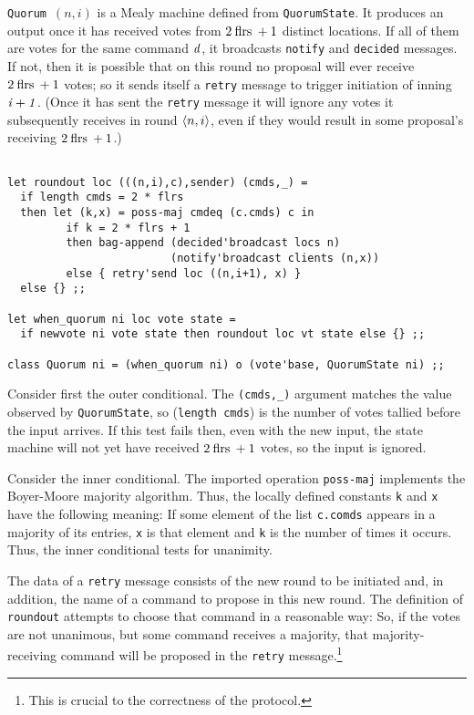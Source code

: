 \documentclass[final]{article}
\newcommand{\listinline}[1]{\text{\lstinline{#1}}}
\begin{document}
\lstinline{Quorum}~$(n,i)$ is a Mealy machine defined from
\lstinline{QuorumState}.  It produces an output once it has received
votes from $2\listinline{flrs}+1$ distinct locations.  If all of them
are votes for the same command $\mathit{d}$, it broadcasts
\lstinline{notify} and \lstinline{decided} messages.  If not, then it
is possible that on this round no proposal will ever receive
$2\listinline{flrs}+1$ votes; so it sends itself a \lstinline{retry}
message to trigger initiation of inning $\mathit{i+1}$.  (Once it has
sent the \lstinline{retry} message it will ignore any votes it
subsequently receives in round $\langle n,i\rangle$, even if they would
result in some proposal's receiving $2\listinline{flrs}+1$.)
\begin{emlcode}
\begin{lstlisting}

let roundout loc (((n,i),c),sender) (cmds,_) =
  if length cmds = 2 * flrs
  then let (k,x) = poss-maj cmdeq (c.cmds) c in
         if k = 2 * flrs + 1
         then bag-append (decided'broadcast locs n)
                         (notify'broadcast clients (n,x))
         else { retry'send loc ((n,i+1), x) }
  else {} ;;

let when_quorum ni loc vote state =
  if newvote ni vote state then roundout loc vt state else {} ;;

class Quorum ni = (when_quorum ni) o (vote'base, QuorumState ni) ;;
\end{lstlisting}
\end{emlcode}

Consider first the outer conditional.  The \lstinline{(cmds,_)}
argument matches the value observed by \lstinline{QuorumState}, so
(\lstinline{length cmds}) is the number of votes tallied before the
input arrives.  If this test fails then, even with the new input, the
state machine will not yet have received $2\listinline{flrs}+1$ votes,
so the input is ignored.

Consider the inner conditional.  The imported operation
\lstinline{poss-maj} implements the Boyer-Moore majority algorithm.
Thus, the locally defined constants \lstinline{k} and \lstinline{x}
have the following meaning: If some element of the list
\lstinline{c.comds} appears in a majority of its entries,
\lstinline{x} is that element and \lstinline{k} is the number of times
it occurs.  Thus, the inner conditional tests for unanimity.

The data of a \lstinline{retry} message consists of the new round to
be initiated and, in addition, the name of a command to propose in
this new round.  The definition of \lstinline{roundout} attempts to
choose that command in a reasonable way:   So, if the votes are
not unanimous, but some command receives a majority, that
majority-receiving command will be proposed in the \lstinline{retry}
message.\footnote{This is crucial to the correctness of the protocol.}
\end{document}

